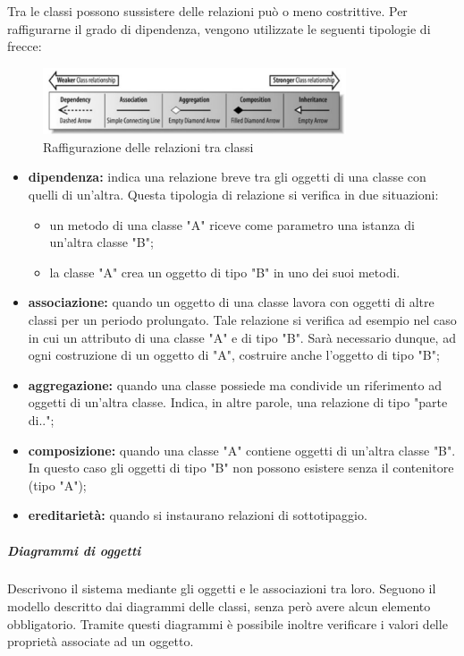 \noindent Tra le classi possono sussistere delle relazioni può o meno costrittive. Per raffigurarne il grado di dipendenza, vengono utilizzate le seguenti tipologie di frecce:
\begin{figure}[h!]
	\caption{Raffigurazione delle relazioni tra classi}
	\centering
	\includegraphics[width=0.8\textwidth]{res/img/relazioniClassi.png}
\end{figure}
\begin{itemize}
	\item \textbf{dipendenza:} indica una relazione breve tra gli oggetti di una classe con quelli di un'altra. Questa tipologia di relazione si verifica in due situazioni:
	\begin{itemize}
		\item un metodo di una classe "A" riceve come parametro una istanza di un'altra classe "B";
		\item la classe "A" crea un oggetto di tipo "B" in uno dei suoi metodi.
	\end{itemize} 
	\item \textbf{associazione:} quando un oggetto di una classe lavora con oggetti di altre classi per un periodo prolungato. Tale relazione si verifica ad esempio nel caso in cui un attributo di una classe "A" e di tipo "B". Sarà necessario dunque, ad ogni costruzione di un oggetto di "A", costruire anche l'oggetto di tipo "B";
	\item \textbf{aggregazione:}  quando una classe possiede ma condivide un riferimento ad oggetti di
	un’altra classe. Indica, in altre parole, una relazione di tipo "parte di..";
	\item \textbf{composizione:} quando una classe "A" contiene oggetti di un’altra classe "B". In questo caso gli oggetti di tipo "B" non possono esistere senza il contenitore (tipo "A");
	\item \textbf{ereditarietà:} quando si instaurano relazioni di sottotipaggio.
\end{itemize}

\subparagraph*{Diagrammi di oggetti} Descrivono il sistema mediante gli oggetti e le associazioni tra loro. Seguono il modello descritto dai diagrammi delle classi, senza però avere alcun elemento obbligatorio. Tramite questi diagrammi è possibile inoltre verificare i valori delle proprietà associate ad un oggetto.

